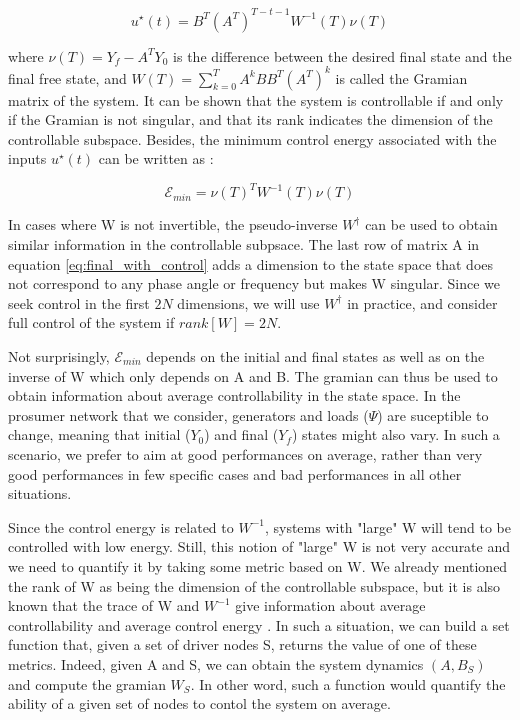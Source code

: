 \documentclass[conference]{IEEEtran}
\begin{document}
\begin{equation}
\label{eq:ustar}
 u^{\star}(t) = B^T(A^T)^{T-t-1}W^{-1}(T)\nu(T)
\end{equation}


where $ \nu(T) = Y_f - A^T Y_0 $ is the difference between the desired final state and the final free state, and $W(T) = \sum_{k=0}^{T} A^k B B^T (A^T)^k $ is called the Gramian matrix of the system. It can be shown that the system is controllable if and only if the Gramian is not singular, and that its rank indicates the dimension of the controllable subspace. Besides, the minimum control energy associated with the inputs $ u^{\star}(t)$ can be written as :


\begin{equation}
\label{eq:energy}
 \mathcal{E}_{min} = \nu(T)^T W^{-1}(T) \nu(T)
\end{equation}

In cases where W is not invertible, the pseudo-inverse $W^{\dagger}$ can be used to obtain similar information in the controllable subpsace. The last row of matrix A in equation \ref{eq:final_with_control} adds a dimension to the state space that does not correspond to any phase angle or frequency but makes W singular. Since we seek control in the first $2N$ dimensions, we will use $W^{\dagger}$ in practice, and consider full control of the system if $rank[W]=2N$. 

Not surprisingly, $\mathcal{E}_{min}$ depends on the initial and final states as well as on the inverse of W which only depends on A and B. The gramian can thus be used to obtain information about average controllability in the state space. In the prosumer network that we consider, generators and loads ($\Psi$) are suceptible to change, meaning that initial ($Y_0$) and final ($Y_f$) states might also vary. In such a scenario, we prefer to aim at good performances on average, rather than very good performances in few specific cases and bad performances in all other situations.

Since the control energy is related to $ W^{-1} $, systems with "large" W will tend to be controlled with low energy. Still, this notion of "large" W is not very accurate and we need to quantify it by taking some metric based on W. We already mentioned the rank of W as being the dimension of the controllable subspace, but it is also known that the trace of W and $W^{-1}$ give information about average controllability and average control energy \cite{Summers2014}. In such a situation, we can build a set function that, given a set of driver nodes S, returns the value of one of these metrics. Indeed, given A and S, we can obtain the system dynamics $(A,B_S)$ and compute the gramian $W_S$. In other word, such a function would quantify the ability of a given set of nodes to contol the system on average.
\end{document}
